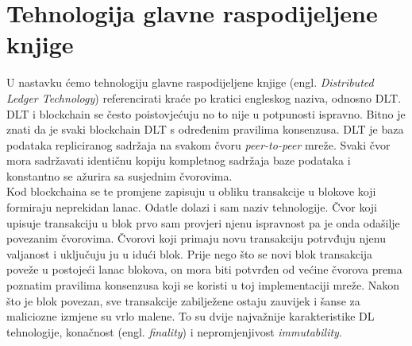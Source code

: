 \documentclass[times, utf8, zavrsni, numeric]{fer}
\begin{document}
\chapter{Tehnologija glavne raspodijeljene knjige}
U nastavku ćemo tehnologiju glavne raspodijeljene knjige (engl. \emph{Distributed Ledger Technology})
 referencirati kraće po kratici engleskog naziva, odnosno DLT. \\ 
DLT i blockchain se često poistovjećuju no to nije u potpunosti ispravno. Bitno je znati da je 
svaki blockchain DLT s određenim pravilima konsenzusa.
DLT je baza podataka repliciranog sadržaja na svakom čvoru \emph{peer-to-peer} mreže. Svaki čvor
mora sadržavati identičnu kopiju kompletnog sadržaja baze podataka i konstantno se ažurira sa susjednim čvorovima. \\
Kod blockchaina se te promjene zapisuju u obliku transakcije u blokove koji formiraju neprekidan lanac.
Odatle dolazi i sam naziv tehnologije. Čvor koji upisuje transakciju u blok prvo sam provjeri njenu ispravnost pa je onda odašilje povezanim čvorovima.
Čvorovi koji primaju novu transakciju potrvđuju njenu valjanost i uključuju ju u idući blok. Prije nego što se novi blok transakcija poveže u postojeći lanac
blokova, on mora biti potvrđen od većine čvorova prema poznatim pravilima konsenzusa koji se koristi
u toj implementaciji mreže. Nakon što je blok povezan, sve transakcije zabilježene ostaju zauvijek i
šanse za maliciozne izmjene su vrlo malene. To su dvije najvažnije karakteristike DL tehnologije, konačnost (engl. \emph{finality}) i nepromjenjivost \emph{immutability}.
\end{document}
